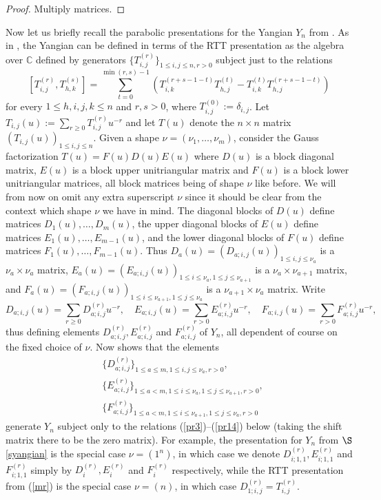 \documentclass[twoside,12pt,reqno]{amsart}
\def\C{{\mathbb C}}
\begin{document}
\begin{proof}
Multiply matrices.
\end{proof}

Now let us briefly recall the parabolic presentations for the
Yangian $Y_n$ from \cite{BK}. 
As in \cite{MNO}, the Yangian can be defined
in terms of the RTT presentation as the algebra over $\C$
defined by generators $\{T_{i,j}^{(r)}\}_{1 \leq i,j \leq n, r >0}$
subject just to the relations
\begin{equation}\label{mr}
[T_{i,j}^{(r)}, T_{h,k}^{(s)}]
= \sum_{t=0}^{\min(r,s)-1}
\left( 
T_{i,k}^{(r+s-1-t)}T_{h,j}^{(t)} -
T_{i,k}^{(t)}T_{h,j}^{(r+s-1-t)}
\right)
\end{equation}
for every $1 \leq h,i,j,k \leq n$ and $r,s > 0$,
where $T_{i,j}^{(0)} := \delta_{i,j}$.
Let $T_{i,j}(u) := \sum_{r \geq 0} T_{i,j}^{(r)} u^{-r}$
and let $T(u)$ denote the $n \times n$ matrix
$(T_{i,j}(u))_{1 \leq i,j \leq n}$.
Given a shape $\nu = (\nu_1,\dots,\nu_m)$, 
consider the Gauss factorization
$T(u) = F(u) D(u) E(u)$ where $D(u)$ is a block diagonal matrix,
$E(u)$ is a block upper unitriangular matrix and $F(u)$
is a block lower unitriangular matrices, all block matrices
being of shape $\nu$ like before. 
We will from now on
omit any extra superscript $\nu$ since it should be clear
from the context which shape $\nu$ we have in mind.
The diagonal blocks of $D(u)$ define matrices
$D_1(u),\dots,D_m(u)$, the upper diagonal blocks of $E(u)$
define matrices $E_1(u),\dots, E_{m-1}(u)$, and the lower diagonal
blocks of $F(u)$ define matrices $F_1(u), \dots, F_{m-1}(u)$.
Thus $D_a(u) = (D_{a;i,j}(u))_{1 \leq i,j \leq \nu_a}$ is a
$\nu_a \times \nu_a$ matrix,
$E_a(u) = (E_{a;i,j}(u))_{1 \leq i \leq \nu_a, 1 \leq j \leq \nu_{a+1}}$
is a $\nu_a \times \nu_{a+1}$ matrix, and
$F_a(u) = (F_{a;i,j}(u))_{1 \leq i \leq \nu_{a+1}, 1 \leq j \leq \nu_a}$
is a $\nu_{a+1} \times \nu_a$ matrix.
Write
$$
D_{a;i,j}(u) = \sum_{r \geq 0} D_{a;i,j}^{(r)} u^{-r},\quad
E_{a;i,j}(u) = \sum_{r > 0} E_{a;i,j}^{(r)} u^{-r},\quad
F_{a;i,j}(u) = \sum_{r > 0} F_{a;i,j}^{(r)} u^{-r},
$$
thus defining elements $D_{a;i,j}^{(r)}, E_{a;i,j}^{(r)}$
and $F_{a;i,j}^{(r)}$ of $Y_n$, all dependent of course on the
fixed choice of $\nu$.
Now \cite[Theorem A]{BK} shows that the elements
\begin{align*}
&\{D_{a;i,j}^{(r)}\}_{1 \leq a \leq m, 1 \leq i,j \leq \nu_a,
r >0},\\
&\{E_{a;i,j}^{(r)}\}_{1 \leq a < m, 1 \leq i \leq \nu_a, 1 \leq j \leq \nu_{a+1},
r >0},\\
&\{F_{a;i,j}^{(r)}\}_{1 \leq a < m, 1 \leq i \leq \nu_{a+1}, 1 \leq j \leq \nu_{a},
r >0}
\end{align*}
generate $Y_n$ subject only to 
the relations (\ref{pr3})--(\ref{pr14}) below (taking
the shift matrix there to be the zero matrix).
For example, the presentation for $Y_n$ from $\S$\ref{syangian} is 
the special case $\nu = (1^n)$, in which case we denote
$D_{i;1,1}^{(r)}, E_{i;1,1}^{(r)}$ and $F_{i;1,1}^{(r)}$ 
simply by $D_i^{(r)}, E_i^{(r)}$ and $F_i^{(r)}$ respectively,
while the RTT presentation from (\ref{mr}) is the special
case $\nu = (n)$, in which case
$D_{1;i,j}^{(r)}=T_{i,j}^{(r)}$.
\end{document}

